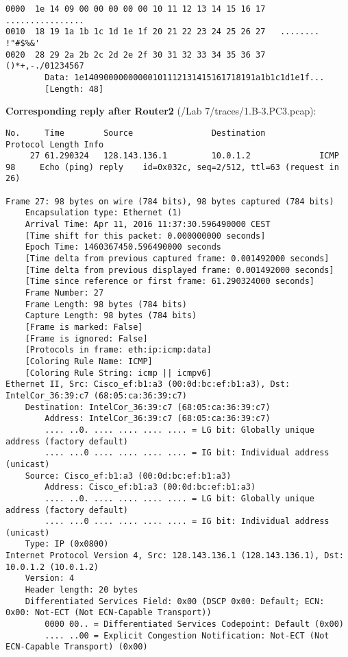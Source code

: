\begin{lstlisting}
0000  1e 14 09 00 00 00 00 00 10 11 12 13 14 15 16 17   ................
0010  18 19 1a 1b 1c 1d 1e 1f 20 21 22 23 24 25 26 27   ........ !"#$%&'
0020  28 29 2a 2b 2c 2d 2e 2f 30 31 32 33 34 35 36 37   ()*+,-./01234567
        Data: 1e14090000000000101112131415161718191a1b1c1d1e1f...
        [Length: 48]
\end{lstlisting}


\textbf{Corresponding reply after Router2} (/Lab 7/traces/1.B-3.PC3.pcap):
\begin{lstlisting}
No.     Time        Source                Destination           Protocol Length Info
     27 61.290324   128.143.136.1         10.0.1.2              ICMP     98     Echo (ping) reply    id=0x032c, seq=2/512, ttl=63 (request in 26)

Frame 27: 98 bytes on wire (784 bits), 98 bytes captured (784 bits)
    Encapsulation type: Ethernet (1)
    Arrival Time: Apr 11, 2016 11:37:30.596490000 CEST
    [Time shift for this packet: 0.000000000 seconds]
    Epoch Time: 1460367450.596490000 seconds
    [Time delta from previous captured frame: 0.001492000 seconds]
    [Time delta from previous displayed frame: 0.001492000 seconds]
    [Time since reference or first frame: 61.290324000 seconds]
    Frame Number: 27
    Frame Length: 98 bytes (784 bits)
    Capture Length: 98 bytes (784 bits)
    [Frame is marked: False]
    [Frame is ignored: False]
    [Protocols in frame: eth:ip:icmp:data]
    [Coloring Rule Name: ICMP]
    [Coloring Rule String: icmp || icmpv6]
Ethernet II, Src: Cisco_ef:b1:a3 (00:0d:bc:ef:b1:a3), Dst: IntelCor_36:39:c7 (68:05:ca:36:39:c7)
    Destination: IntelCor_36:39:c7 (68:05:ca:36:39:c7)
        Address: IntelCor_36:39:c7 (68:05:ca:36:39:c7)
        .... ..0. .... .... .... .... = LG bit: Globally unique address (factory default)
        .... ...0 .... .... .... .... = IG bit: Individual address (unicast)
    Source: Cisco_ef:b1:a3 (00:0d:bc:ef:b1:a3)
        Address: Cisco_ef:b1:a3 (00:0d:bc:ef:b1:a3)
        .... ..0. .... .... .... .... = LG bit: Globally unique address (factory default)
        .... ...0 .... .... .... .... = IG bit: Individual address (unicast)
    Type: IP (0x0800)
Internet Protocol Version 4, Src: 128.143.136.1 (128.143.136.1), Dst: 10.0.1.2 (10.0.1.2)
    Version: 4
    Header length: 20 bytes
    Differentiated Services Field: 0x00 (DSCP 0x00: Default; ECN: 0x00: Not-ECT (Not ECN-Capable Transport))
        0000 00.. = Differentiated Services Codepoint: Default (0x00)
        .... ..00 = Explicit Congestion Notification: Not-ECT (Not ECN-Capable Transport) (0x00)

\end{lstlisting}
